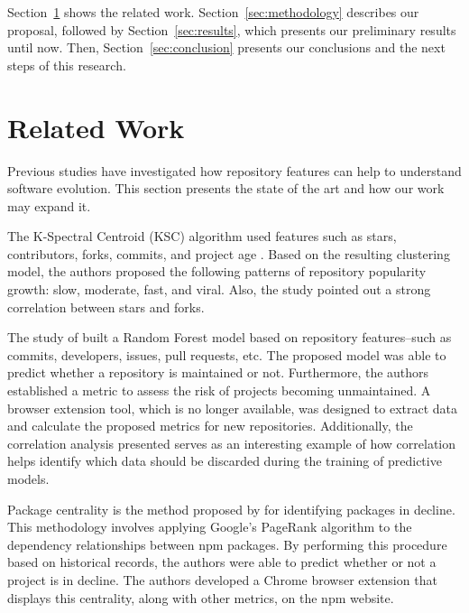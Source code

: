 \documentclass[10pt,conference,peerreview]{IEEEtran}
\begin{document}
Section~\ref{sec:background} shows the related work. Section~\ref{sec:methodology} describes our proposal, followed by Section~\ref{sec:results}, which presents our preliminary results until now. Then, Section~\ref{sec:conclusion} presents our conclusions and the next steps of this research.

\section{Related Work}
\label{sec:background}
Previous studies have investigated how repository features can help to understand software evolution. This section presents the state of the art and how our work may expand it.

The K-Spectral Centroid (KSC) algorithm used features such as stars, contributors, forks, commits, and project age \cite{borges2016}. Based on the resulting clustering model, the authors proposed the following patterns of repository popularity growth: slow, moderate, fast, and viral. Also, the study pointed out a strong correlation between stars and forks.


The study of \cite{coelho2020} built a Random Forest model based on repository features--such as commits, developers, issues, pull requests, etc. The proposed model was able to predict whether a repository is maintained or not. Furthermore, the authors established a metric to assess the risk of projects becoming unmaintained. A browser extension tool, which is no longer available, was designed to extract data and calculate the proposed metrics for new repositories. Additionally, the correlation analysis presented serves as an interesting example of how correlation helps identify which data should be discarded during the training of predictive models.

Package centrality is the method proposed by \cite{mujahid2022} for identifying packages in decline. This methodology involves applying Google's PageRank algorithm to the dependency relationships between npm packages. By performing this procedure based on historical records, the authors were able to predict whether or not a project is in decline. The authors developed a Chrome browser extension that displays this centrality, along with other metrics, on the npm website.
\end{document}

